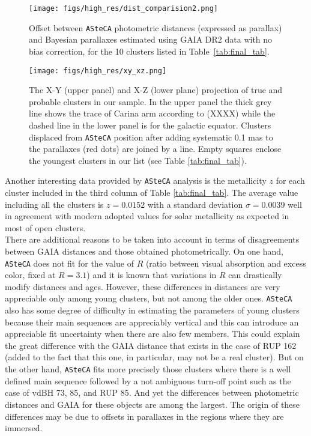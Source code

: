 \documentclass{aa}
\begin{document}
\begin{figure}[ht]
    \centering
    \texttt{[image: figs/high\_res/dist\_comparision2.png]}
    \caption{Offset between \texttt{ASteCA} photometric distances (expressed
    as parallax) and Bayesian parallaxes estimated using GAIA DR2 data with no
    bias correction, for the 10 clusters listed in Table~\ref{tab:final_tab}.}
    \label{fig:dist_compar2}
\end{figure}

\begin{figure}[ht]
    \centering
    \texttt{[image: figs/high\_res/xy\_xz.png]}
    \caption{The X-Y (upper panel) and X-Z (lower plane) projection of true and
    probable clusters in our sample. In the upper panel the thick grey line
    shows the trace of Carina arm according to (XXXX) while the dashed line in
    the lower panel is for the galactic equator. Clusters displaced from 
    \texttt{ASteCA} position after adding systematic 0.1 mas to the parallaxes 
    (red dots) are joined by a line. Empty squares enclose the youngest clusters
    in our list (see Table \ref{tab:final_tab}).}
    \label{fig68}
\end{figure}

Another interesting data provided by \texttt{ASteCA} analysis is the metallicity
$z$ for each cluster included in the third column of Table \ref{tab:final_tab}.
The average value including all the clusters is $z=0.0152$ with a standard
deviation $\sigma = 0.0039$ well in agreement with modern adopted values for
solar metallicity as expected in most of open clusters.\\

There are additional reasons to be taken into account in terms of disagreements
between GAIA distances and those obtained photometrically. On one hand, 
\texttt{ASteCA} does not fit for the value of $R$ (ratio between visual
absorption and excess color, fixed at $R=3.1$) and it is known that variations
in $R$ can drastically modify distances and ages. However, these differences in
distances are very appreciable only among young clusters, but not among the
older ones. 
\texttt{ASteCA} also has some degree of difficulty in estimating the parameters
of young clusters because their main sequences are appreciably vertical and
this can introduce an appreciable fit uncertainty when there are also few
members.
This could explain the great difference with the GAIA distance that exists in
the case of RUP 162 (added to the fact that this one, in particular, may not be
a real cluster). But on the other hand, \texttt{ASteCA} fits more precisely
those clusters where there is a well defined main sequence followed by a not
ambiguous turn-off point such as the case of vdBH 73, 85, and RUP 85. And yet
the differences between photometric distances and GAIA for these objects are
among the largest. The origin of these differences may be due to offsets in
parallaxes in the regions where they are immersed.
\end{document}
